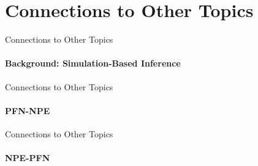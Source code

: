 \section{Connections to Other Topics}

\begin{frame}{Connections to Other Topics}
  \framesubtitle{Background: Simulation-Based Inference}
\end{frame}

\begin{frame}{Connections to Other Topics}
  \framesubtitle{PFN-NPE}
\end{frame}

\begin{frame}{Connections to Other Topics}
  \framesubtitle{NPE-PFN}
\end{frame}
